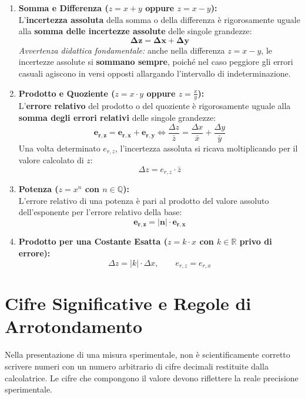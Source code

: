 \documentclass[11pt,a4paper,oneside]{report}
\begin{document}
\begin{leggefisica}
\begin{enumerate}[label=\textbf{\arabic*.}]
  \item \textbf{Somma e Differenza ($z = x + y$ oppure $z = x - y$):}\\
  L'\textbf{incertezza assoluta} della somma o della differenza è rigorosamente uguale alla \textbf{somma delle incertezze assolute} delle singole grandezze:
  \[
  \mathbf{\Delta z = \Delta x + \Delta y}
  \]
  \textit{Avvertenza didattica fondamentale:} anche nella differenza $z = x - y$, le incertezze assolute si \textbf{sommano sempre}, poiché nel caso peggiore gli errori casuali agiscono in versi opposti allargando l'intervallo di indeterminazione.
  
  \item \textbf{Prodotto e Quoziente ($z = x \cdot y$ oppure $z = \frac{x}{y}$):}\\
  L'\textbf{errore relativo} del prodotto o del quoziente è rigorosamente uguale alla \textbf{somma degli errori relativi} delle singole grandezze:
  \[
  \mathbf{e_{r,z} = e_{r,x} + e_{r,y}} \iff \frac{\Delta z}{\bar{z}} = \frac{\Delta x}{\bar{x}} + \frac{\Delta y}{\bar{y}}
  \]
  Una volta determinato $e_{r,z}$, l'incertezza assoluta si ricava moltiplicando per il valore calcolato di $z$:
  \[
  \Delta z = e_{r,z} \cdot \bar{z}
  \]
  
  \item \textbf{Potenza ($z = x^n$ con $n \in \mathbb{Q}$):}\\
  L'errore relativo di una potenza è pari al prodotto del valore assoluto dell'esponente per l'errore relativo della base:
  \[
  \mathbf{e_{r,z} = |n| \cdot e_{r,x}}
  \]
  
  \item \textbf{Prodotto per una Costante Esatta ($z = k \cdot x$ con $k \in \mathbb{R}$ privo di errore):}\\
  \[
  \Delta z = |k| \cdot \Delta x, \qquad e_{r,z} = e_{r,x}
  \]
\end{enumerate}
\end{leggefisica}

\section{Cifre Significative e Regole di Arrotondamento}
Nella presentazione di una misura sperimentale, non è scientificamente corretto scrivere numeri con un numero arbitrario di cifre decimali restituite dalla calcolatrice. 
Le cifre che compongono il valore devono riflettere la reale precisione sperimentale.
\end{document}
